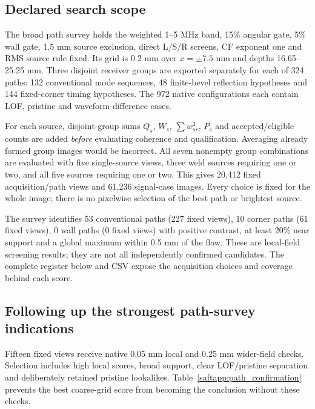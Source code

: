 \subsection{Declared search scope}
The broad path survey holds the weighted 1--5 MHz band, 15\% angular gate, 5\% wall gate, 1.5 mm source exclusion, direct L/S/R screens, CF exponent one and RMS source rule fixed. Its grid is 0.2 mm over $x=\pm7.5$ mm and depths 16.65--25.25 mm. Three disjoint receiver groups are exported separately for each of 324 paths: 132 conventional mode sequences, 48 finite-bevel reflection hypotheses and 144 fixed-corner timing hypotheses. The 972 native configurations each contain LOF, pristine and waveform-difference cases.

For each source, disjoint-group sums $Q_s$, $W_s$, $\sum w_{sr}^2$, $P_s$ and accepted/eligible counts are added \emph{before} evaluating coherence and qualification. Averaging already formed group images would be incorrect. All seven nonempty group combinations are evaluated with five single-source views, three weld sources requiring one or two, and all five sources requiring one or two. This gives 20,412 fixed acquisition/path views and 61,236 signal-case images. Every choice is fixed for the whole image; there is no pixelwise selection of the best path or brightest source.

The survey identifies 53 conventional paths (227 fixed views), 10 corner paths (61 fixed views), 0 wall paths (0 fixed views) with positive contrast, at least 20\% near support and a global maximum within 0.5 mm of the flaw. These are local-field screening results; they are not all independently confirmed candidates. The complete register below and CSV expose the acquisition choices and coverage behind each score.

\subsection{Following up the strongest path-survey indications}
Fifteen fixed views receive native 0.05 mm local and 0.25 mm wider-field checks. Selection includes high local scores, broad support, clear LOF/pristine separation and deliberately retained pristine lookalikes. Table~\ref{saftapp:path_confirmation} prevents the best coarse-grid score from becoming the conclusion without these checks.

